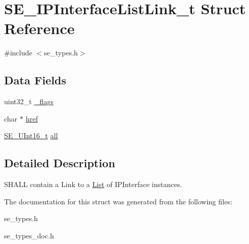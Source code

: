 \hypertarget{structSE__IPInterfaceListLink__t}{}\section{S\+E\+\_\+\+I\+P\+Interface\+List\+Link\+\_\+t Struct Reference}
\label{structSE__IPInterfaceListLink__t}


{\ttfamily \#include $<$se\+\_\+types.\+h$>$}

\subsection*{Data Fields}
\begin{DoxyCompactItemize}
\item 
uint32\+\_\+t \hyperlink{group__IPInterfaceListLink_gadec76351c50ca25f3c436f8a5c034110}{\+\_\+flags}
\item 
char $\ast$ \hyperlink{group__IPInterfaceListLink_ga2e91acf15facca125f3e17b33e429b70}{href}
\item 
\hyperlink{group__UInt16_gac68d541f189538bfd30cfaa712d20d29}{S\+E\+\_\+\+U\+Int16\+\_\+t} \hyperlink{group__IPInterfaceListLink_ga4f3744f432c05a0c9abe6120b6661fc6}{all}
\end{DoxyCompactItemize}


\subsection{Detailed Description}
S\+H\+A\+LL contain a Link to a \hyperlink{structList}{List} of I\+P\+Interface instances. 

The documentation for this struct was generated from the following files\+:\begin{DoxyCompactItemize}
\item 
se\+\_\+types.\+h\item 
se\+\_\+types\+\_\+doc.\+h\end{DoxyCompactItemize}
